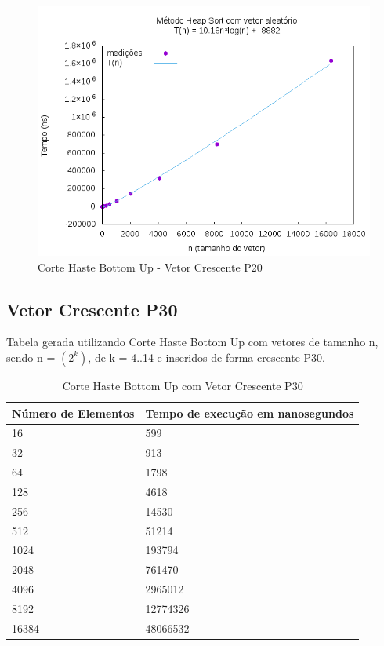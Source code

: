 \documentclass[12pt,a4paper,twoside]{report}
\begin{document}
\begin{figure}[H]
    \centering
    \includegraphics[width=0.7\linewidth]{graficos/HeapSort/vIntAleatorio/vIntAleatorio.png}
  \caption{Corte Haste Bottom Up - Vetor Crescente P20}
\end{figure}




\subsection{Vetor Crescente P30}
Tabela gerada utilizando Corte Haste Bottom Up com vetores de tamanho n, sendo n = $(2^k)$, de k = 4..14 e inseridos de forma crescente P30.
\begin{table}[H]
\centering
\caption{Corte Haste Bottom Up com Vetor Crescente P30}
\label{my-label}
\begin{tabular}{|l|l|}
\hline
\multicolumn{1}{|c|}{\textbf{Número de Elementos}} & \multicolumn{1}{c|}{\textbf{Tempo de execução em nanosegundos}} \\ \hline
16 & 599 \\ \hline
32 & 913 \\ \hline
64 & 1798 \\ \hline
128 & 4618 \\ \hline
256 & 14530 \\ \hline
512 & 51214 \\ \hline
1024 & 193794 \\ \hline
2048 & 761470 \\ \hline
4096 & 2965012 \\ \hline
8192 & 12774326 \\ \hline
16384 & 48066532 \\ \hline
\end{tabular}
\end{table}
\end{document}

